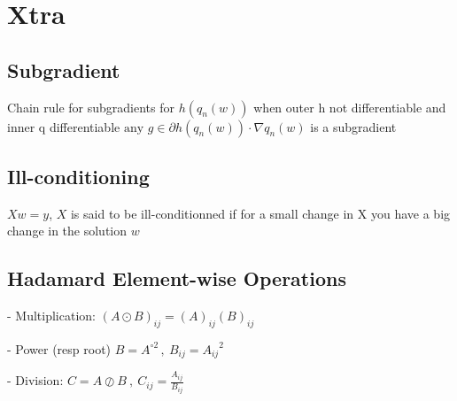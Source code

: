 \section{Xtra}

\subsection*{Subgradient}
Chain rule for subgradients for $h(q_n(w))$ when outer h not differentiable and inner q differentiable 
$\text{any } g\in\partial h(q_n(w))\cdot{\nabla q_n(w)}$
is a subgradient

\subsection*{Ill-conditioning}

$Xw=y$, $X$ is said to be ill-conditionned if for a small change in X you have a big change in the solution $w$

\subsection*{Hadamard Element-wise Operations}

- Multiplication: $(A\odot B)_{ij}=(A)_{ij}(B)_{ij}$

- Power (resp root) $B=A^{\circ2} \,, \ B_{ij}={A_{ij}}^2$

- Division: $C=A\oslash B \ ,\ C_{ij}=\frac{A_{ij}}{B_{ij}}$